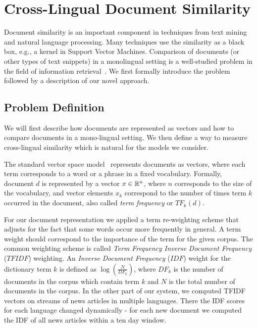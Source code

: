 %
\chapter{Cross-Lingual Document Similarity}\label{chap:crosslingual}

Document similarity is an important component in techniques from text mining and natural language processing.
Many techniques use the similarity as a black box, e.g., a kernel in Support Vector Machines.
Comparison of documents (or other types of text snippets) in a monolingual setting is a
well-studied problem in the field of information retrieval~\cite{Salton88term-weightingapproaches}.
We first formally introduce the problem followed by a description of our novel approach.

\section{Problem Definition}\label{chap:crosslingual:problem}
We will first describe how documents are represented as vectors and how to compare documents in
a mono-lingual setting. We then define a way to measure cross-lingual similarity which is natural
for the models we consider.

The standard vector space model~\cite{Salton88term-weightingapproaches} represents documents as
vectors, where each term corresponds to a word or a phrase in a fixed vocabulary. Formally,
document $d$ is represented by a vector $x \in \mathbb{R}^n$, where $n$ corresponds to the size
of the vocabulary, and vector elements $x_k$ correspond to the number of times term $k$
occurred in the document, also called \emph{term frequency} or $TF_k(d)$.

For our document representation we applied a term re-weighting scheme that adjusts 
for the fact that some words occur more frequently in general. A term weight should correspond to the importance of the term for the given corpus. The common weighting scheme is called \emph{Term Frequency Inverse Document Frequency} ($TFIDF$) weighting. An \emph{Inverse Document Frequency} ($IDF$) weight for the dictionary term $k$ is defined as $\log\left( \frac{N}{DF_k} \right)$, where $DF_k$ is the number of documents in the corpus which contain term $k$ and $N$ is the total number of documents in the corpus. In the other part of our system, we computed TFIDF vectors on streams
of news articles in multiple languages. There the IDF scores for each language changed
dynamically - for each new document we computed the IDF of all news articles within
a ten day window. 

